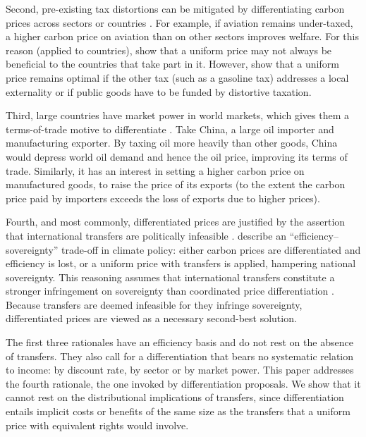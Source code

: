\documentclass[12pt,english]{article}
\theoremstyle{remark}
\begin{document}
Second, pre-existing tax distortions can be mitigated by differentiating carbon prices across sectors or countries \citep{babiker_is_2004,boeters_optimally_2014}. For example, if aviation remains under-taxed, a higher carbon price on aviation than on other sectors improves welfare. For this reason (applied to countries), \citet{babiker_is_2004} show that a uniform price may not always be beneficial to the countries that take part in it. However, \citet{dautume_should_2016} show that a uniform price remains optimal if the other tax (such as a gasoline tax) addresses a local externality or if public goods have to be funded by distortive taxation. %

Third, large countries have market power in world markets, which gives them a terms-of-trade motive to differentiate \citep{babiker_climate_2005,boeters_optimally_2014}. Take China, a large oil importer and manufacturing exporter. 
By taxing oil more heavily than other goods, China would depress world oil demand and hence the oil price, improving its terms of trade. Similarly, it has an interest in setting a higher carbon price on manufactured goods, to raise the price of its exports (to the extent the carbon price paid by importers exceeds the loss of exports due to higher prices).

Fourth, and most commonly, differentiated prices are justified by the assertion that international transfers are politically infeasible \citep{parry_proposal_2021,young-brun_within-country_2025}. \citet{bauer_quantification_2020} describe an ``efficiency--sovereignty'' trade-off in climate policy: either carbon prices are differentiated and efficiency is lost, or a uniform price with transfers is applied, hampering national sovereignty. This reasoning assumes that international transfers constitute a stronger infringement on sovereignty than coordinated price differentiation \citep[see also][]{bekkers_comparing_2022}. Because transfers are deemed infeasible for they infringe sovereignty, differentiated prices are viewed as a necessary second-best solution.

The first three rationales have an efficiency basis and do not rest on the absence of transfers. They also call for a differentiation that bears no systematic relation to income: by discount rate, by sector or by market power. This paper addresses the fourth rationale, the one invoked by differentiation proposals. We show that it cannot rest on the distributional implications of transfers, since differentiation entails implicit costs or benefits of the same size as the transfers that a uniform price with equivalent rights would involve. %
\end{document}
